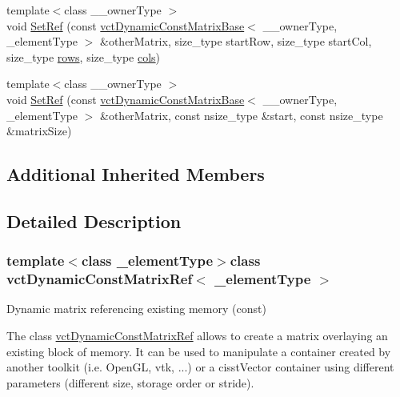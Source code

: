 {\bf }\par
\begin{DoxyCompactItemize}
\item 
{\footnotesize template$<$class \-\_\-\-\_\-owner\-Type $>$ }\\void \hyperlink{classvct_dynamic_const_matrix_ref_a7f6da491ec4bbd91eda5829392fb15ae}{Set\-Ref} (const \hyperlink{classvct_dynamic_const_matrix_base}{vct\-Dynamic\-Const\-Matrix\-Base}$<$ \-\_\-\-\_\-owner\-Type, \-\_\-element\-Type $>$ \&other\-Matrix, size\-\_\-type start\-Row, size\-\_\-type start\-Col, size\-\_\-type \hyperlink{classvct_dynamic_const_matrix_base_a5eac13be2207ebeb8766cde379d73438}{rows}, size\-\_\-type \hyperlink{classvct_dynamic_const_matrix_base_aa6c51d41a100da49a7e7ac7edb20ecd9}{cols})
\item 
{\footnotesize template$<$class \-\_\-\-\_\-owner\-Type $>$ }\\void \hyperlink{classvct_dynamic_const_matrix_ref_ad26a85f8673438f3a4ccfac7b559ab86}{Set\-Ref} (const \hyperlink{classvct_dynamic_const_matrix_base}{vct\-Dynamic\-Const\-Matrix\-Base}$<$ \-\_\-\-\_\-owner\-Type, \-\_\-element\-Type $>$ \&other\-Matrix, const nsize\-\_\-type \&start, const nsize\-\_\-type \&matrix\-Size)
\end{DoxyCompactItemize}

\subsection*{Additional Inherited Members}


\subsection{Detailed Description}
\subsubsection*{template$<$class \-\_\-element\-Type$>$class vct\-Dynamic\-Const\-Matrix\-Ref$<$ \-\_\-element\-Type $>$}

Dynamic matrix referencing existing memory (const) 

The class \hyperlink{classvct_dynamic_const_matrix_ref}{vct\-Dynamic\-Const\-Matrix\-Ref} allows to create a matrix overlaying an existing block of memory. It can be used to manipulate a container created by another toolkit (i.\-e. Open\-G\-L, vtk, ...) or a cisst\-Vector container using different parameters (different size, storage order or stride).

